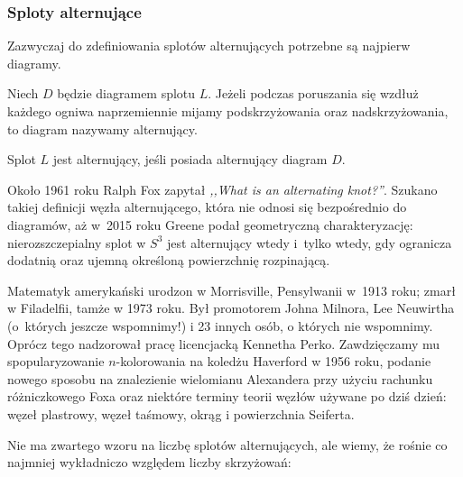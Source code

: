 
\subsubsection{Sploty alternujące}

Zazwyczaj do zdefiniowania splotów alternujących potrzebne są najpierw diagramy.

\begin{definition}
\label{def:alternating_link}%
%
    Niech $D$ będzie diagramem splotu $L$.
    Jeżeli podczas poruszania się wzdłuż każdego ogniwa naprzemiennie mijamy podskrzyżowania oraz nadskrzyżowania, to diagram nazywamy alternujący.
    
    Splot $L$ jest alternujący, jeśli posiada alternujący diagram $D$.
\end{definition}

Około 1961 roku Ralph Fox zapytał \emph{,,What is an alternating knot?''}.
%
Szukano takiej definicji węzła alternującego, która nie odnosi się bezpośrednio do diagramów, aż w~2015 roku Greene \cite{greene2017} podał geometryczną charakteryzację: nierozszczepialny splot w $S^3$ jest alternujący wtedy i~tylko wtedy, gdy ogranicza dodatnią oraz ujemną określoną powierzchnię rozpinającą.
%

\begin{remark}
    Matematyk amerykański urodzon w Morrisville, Pensylwanii w~1913 roku; zmarł w Filadelfii, tamże w 1973 roku.
    Był promotorem Johna Milnora, Lee Neuwirtha (o~których jeszcze wspomnimy!) i 23 innych osób, o których nie wspomnimy.
    Oprócz tego nadzorował pracę licencjacką Kennetha Perko.
    Zawdzięczamy mu spopularyzowanie $n$-kolorowania na koledżu Haverford w 1956 roku, podanie nowego sposobu na znalezienie wielomianu Alexandera przy użyciu rachunku różniczkowego Foxa oraz niektóre terminy teorii węzłów używane po dziś dzień: węzeł plastrowy, węzeł taśmowy, okrąg i powierzchnia Seiferta.
\end{remark}

Nie ma zwartego wzoru na liczbę splotów alternujących, ale wiemy, że rośnie co najmniej wykładniczo względem liczby skrzyżowań:

